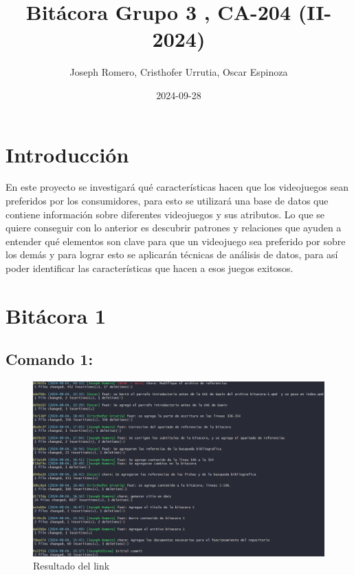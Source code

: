 \documentclass[
  letterpaper,
  DIV=11,
  numbers=noendperiod]{scrreprt}
\title{Bitácora Grupo 3 , CA-204 (II-2024)}
\author{Joseph Romero, Cristhofer Urrutia, Oscar Espinoza}
\date{2024-09-28}
\renewcommand*\contentsname{Tabla de contenidos}
\newcommand\contentsname{Tabla de contenidos}
\begin{document}
\maketitle

\renewcommand*\contentsname{Tabla de contenidos}
{
\hypersetup{linkcolor=}
\setcounter{tocdepth}{2}
\tableofcontents
}

\chapter*{Introducción}\label{introducciuxf3n}


En este proyecto se investigará qué características hacen que los
videojuegos sean preferidos por los consumidores, para esto se utilizará
una base de datos que contiene información sobre diferentes videojuegos
y sus atributos. Lo que se quiere conseguir con lo anterior es descubrir
patrones y relaciones que ayuden a entender qué elementos son clave para
que un videojuego sea preferido por sobre los demás y para lograr esto
se aplicarán técnicas de análisis de datos, para así poder identificar
las características que hacen a esos juegos exitosos.


\chapter{Bitácora 1}\label{bituxe1cora-1}

\section{Comando 1:}\label{comando-1}

\begin{figure}[H]

{\centering \includegraphics{imagenes/link-1.png}

}

\caption{Resultado del link}

\end{figure}%
\end{document}
